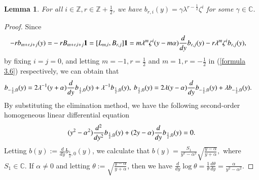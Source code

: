 \documentclass[12pt,reqno]{amsart}
\def\Z{\mathbb{Z}}
\def\C{\mathbb{C}}
\numberwithin{equation}{section}
\newtheorem{lemm}[theo]{Lemma}
\begin{document}
\begin{lemm}\label{le4.6}
For all $i\in\Z,r\in\mathbb{Z}+\frac{1}{2}$, we have $b_{r,i}(y)=\gamma\lambda^{r-\frac{1}{2}}\zeta^i$ for some $\gamma\in \C$.
\end{lemm}
\begin{proof}
Since
\begin{equation}\label{formula 3.6}
\aligned
-rb_{m+r,i+j}(y)=&-rB_{m+r,i+j} \mathbf{1}
=[L_{m,i},B_{r,j}] \mathbf{1}
=m\lambda^m\zeta^i(y-m\alpha)\frac{d }{d {y}}b_{r,j}(y)-r\lambda^m\zeta^ib_{r,j}(y),
\endaligned
\end{equation}
by fixing $i=j=0$, and letting $m=-1, r=\frac{1}{2}$ and $m=1, r=-\frac{1}{2}$ in (\ref{formula 3.6}) respectively, we can obtain that
\begin{equation*}\label{formula 4.6.2}
\aligned
&b_{-\frac{1}{2},0}(y)=2\lambda^{-1}(y+\alpha)\frac{d}{dy}b_{\frac{1}{2},0}(y)+\lambda^{-1}b_{\frac{1}{2},0}(y),\
b_{\frac{1}{2},0}(y)=2\lambda(y-\alpha)\frac{d}{dy}b_{-\frac{1}{2},0}(y)+\lambda b_{-\frac{1}{2},0}(y).
\endaligned
\end{equation*}
By substituting the elimination method, we have the following second-order homogeneous linear differential equation
\begin{equation}\label{formula 3.7}
\aligned
(y^2-\alpha^2)\frac{d^2}{dy^2}b_{\frac{1}{2},0}(y)+(2y-\alpha)\frac{d}{dy}b_{\frac{1}{2},0}(y)=0.
\endaligned
\end{equation}
Letting $b(y):=\frac{d}{dy}b_{\frac{1}{2},0}(y)$, 
we calculate that %
    $b(y)
    =\frac{S_1}{y^2-\alpha^2}\sqrt{\frac{y-\alpha}{y+\alpha}},$
where $S_1\in\C$.
If $\alpha\neq 0$ and letting $\theta:=\sqrt{\frac{y-\alpha}{y+\alpha}}$, then we have %
$\frac{d}{dy}\log{\theta}=\frac{1}{\theta}\frac{d\theta}{dy}
=\frac{\alpha}{y^2-\alpha^2}.$

\end{proof}
\end{document}
